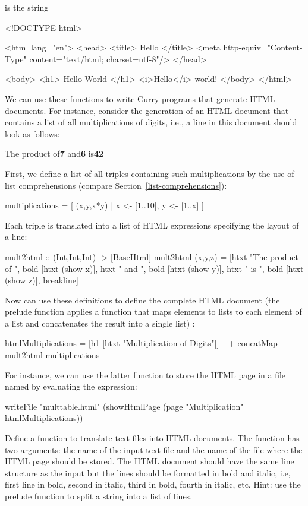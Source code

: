 %
is the string
%
\begin{curry}
<!DOCTYPE html>

<html lang="en">
  <head>
    <title>
      Hello
    </title>
    <meta http-equiv="Content-Type" content="text/html; charset=utf-8"/>
  </head>
  
  <body>
    <h1>
      Hello World
    </h1>
    <i>Hello</i>
    world!
  </body>
</html>
\end{curry}
%
We can use these functions to write Curry programs that generate
HTML documents. For instance, consider the generation of an HTML
document that contains a list of all multiplications of digits,
i.e., a line in this document should look as follows:
\begin{prog}
{\rm The product of{\bf 7} and{\bf 6} is{\bf 42}}
\end{prog}
First, we define a list of all triples containing such multiplications
by the use of list comprehensions (compare Section~\ref{list-comprehensions}):
\begin{curry}
multiplications = [ (x,y,x*y) | x <- [1..10], y <- [1..x] ]
\end{curry}
Each triple is translated into a list of HTML expressions specifying the
layout of a line:
%
\begin{curry}
mult2html :: (Int,Int,Int) -> [BaseHtml]
mult2html (x,y,z) =
 [htxt "The product of ", bold [htxt (show x)],
  htxt " and ", bold [htxt (show y)],
  htxt " is ", bold [htxt (show z)], breakline]
\end{curry}
%
Now can use these definitions to define the complete
HTML document
(the prelude function 
applies a function that maps elements to lists to each element of a list
and concatenates the result into a single list)
:
\begin{curry}
htmlMultiplications =
 [h1 [htxt "Multiplication of Digits"]] ++ concatMap mult2html multiplications
\end{curry}
For instance, we can use the latter function to store the HTML page
in a file named  by evaluating the expression:
\begin{curry}
writeFile "multtable.html"
          (showHtmlPage (page "Multiplication" htmlMultiplications))
\end{curry}
%
\begin{exercise}
Define a function  to translate text files
into HTML documents.
The function has two arguments: the name of the input text file
and the name of the file where the HTML page should
be stored. The HTML document should have the same line structure
as the input but the lines should be formatted in bold and italic, i.e,
first line in bold, second in italic, third in bold, fourth in italic, etc.
Hint: use the prelude function 
to split a string into a list of lines.
\end{exercise}


